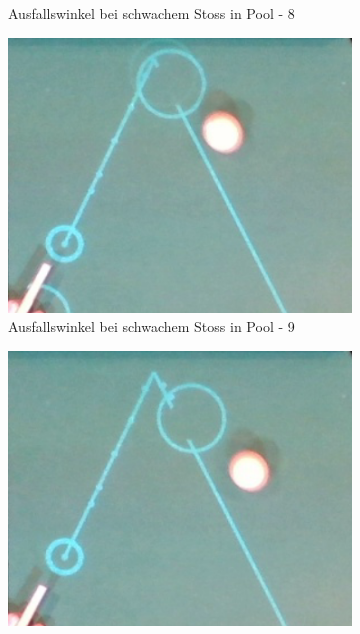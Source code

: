 \begin{figure}[h!]
\begin{subfigure}[b]{0.2\textwidth}
        \caption{Ausfallswinkel bei schwachem Stoss in Pool - 8}
        \label{fig:rebound_angle_slow_pool_8}
    \end{subfigure}
    \hfill
    \begin{subfigure}[b]{0.2\textwidth}
        \centering
        \includegraphics[width=1.0\linewidth]{../common/04_results/resources/simulation/rebound_angle_slow_pool/00_rail_rebound_angle_slow_pool_09.png}
        \caption{Ausfallswinkel bei schwachem Stoss in Pool - 9}
        \label{fig:rebound_angle_slow_pool_9}
    \end{subfigure}
    \hfill
    \begin{subfigure}[b]{0.2\textwidth}
        \centering
        \includegraphics[width=1.0\linewidth]{../common/04_results/resources/simulation/rebound_angle_slow_pool/00_rail_rebound_angle_slow_pool_10.png}

\end{subfigure}
\end{figure}
